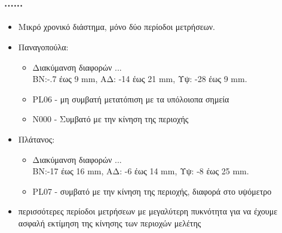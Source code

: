 \documentclass{beamer}
\begin{document}
\begin{frame}\frametitle{......}\framesubtitle{}
\begin{itemize}
	\item Μικρό χρονικό διάστημα, μόνο δύο περίοδοι μετρήσεων.
	\item Παναγοπούλα:
	\begin{itemize}
		\item Διακύμανση διαφορών ...\\
			ΒΝ:-.7 έως 9 mm, ΑΔ: -14 έως 21 mm, Υψ: -28 έως 9 mm.
		\item PL06 - μη συμβατή μετατόπιση με τα υπόλοιοπα σημεία
		\item N000 - Συμβατό με την κίνηση της περιοχής
	\end{itemize}
	\item Πλάτανος:
	\begin{itemize}
		\item Διακύμανση διαφορών ... \\
			ΒΝ:-17 έως 16 mm, ΑΔ: -6 έως 14 mm, Υψ: -8 έως 25 mm.
		\item PL07 - συμβατό με την κίνηση της περιοχής, διαφορά στο υψόμετρο
	\end{itemize}
	\item περισσότερες περίοδοι μετρήσεων με μεγαλύτερη πυκνότητα για να έχουμε ασφαλή εκτίμηση της κίνησης των περιοχών μελέτης
\end{itemize}
\end{frame}
\end{document}
